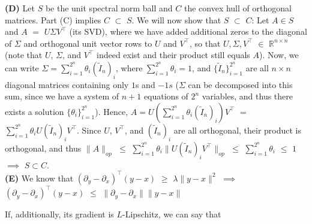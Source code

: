 \documentclass{article}
\begin{document}
\textbf{(D)} Let $S$ be the unit spectral norm ball and $C$ the convex hull of orthogonal
matrices. Part (C) implies $C$ $\subset$ $S$. We will now show that $S$
$\subset$ $C$: Let $A \in S$ and $A$ $=$ $U \Sigma V^{\top}$ (its SVD), where
we have added additional zeros to the diagonal of $\Sigma$ and orthogonal unit
vector rows to $U$ and $V^{\top}$, so that $U,\Sigma,V^{\top}$ $\in$
$\mathbb{R}^{n \times n}$ (note that $U$, $\Sigma$, and $V^{\top}$ indeed exist
and their product still equals $A$). Now, we can write $\Sigma =
\sum_{i=1}^{2^n} \theta_i (\tilde{I}_n)_i$, where $\sum_{i=1}^{2^n} \theta_i =
1$, and $\{\tilde{I}_n\}_{i=1}^{2^n}$ are all $n \times n$ diagonal matrices
containing only $1$s and $-1s$ ($\Sigma$ can be decomposed into this sum, since
we have a system of $n+1$ equations of $2^n$ variables, and thus there exists a
solution $\{\theta_i\}_{i=1}^{2^n}$). Hence, $A = U (\sum_{i=1}^{2^n} \theta_i
(\tilde{I}_n)_i)V^{\top}$ $=$ $\sum_{i=1}^{2^n} \theta_i U(\tilde{I}_n)_i
V^{\top}$. Since $U$, $V^{\top}$, and $(\tilde{I}_n)_i$ are all orthogonal,
their product is orthogonal, and thus $\|A\|_{op}$ $\leq$ $\sum_{i=1}^{2^n}
\theta_i \|U (\tilde{I}_n)_i V^{\top}\|_{op}$ $\leq$ $\sum_{i=1}^{2^n}
\theta_i$ $\leq$ $1$ $\implies$ $S \subset C$.\\


\textbf{(E)} We know that $(\partial_y - \partial_x)^{\top}(y-x)$ $\geq$
$\lambda \|y-x\|^2$ $\implies$ $(\partial_y - \partial_x)^{\top}(y-x)$ $\leq$
$\|\partial_y-\partial_x\| \|y-x\|$

If, additionally, its gradient is $L$-Lipschitz, we can say that 
\end{document}
